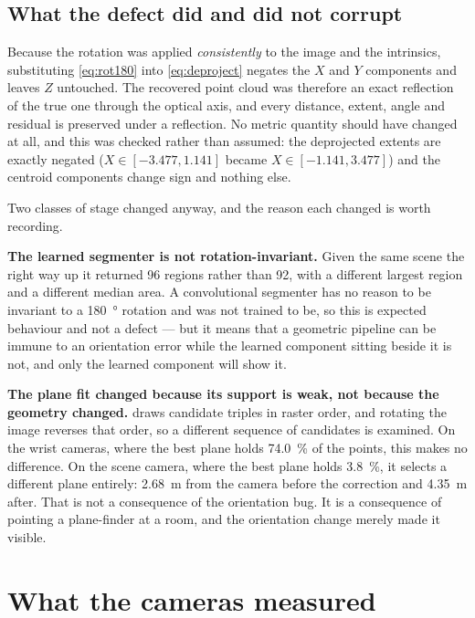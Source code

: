 \subsection{What the defect did and did not corrupt}

Because the rotation was applied \emph{consistently} to the image and the
intrinsics, substituting \cref{eq:rot180} into \cref{eq:deproject} negates the
$X$ and $Y$ components and leaves $Z$ untouched. The recovered point cloud was
therefore an exact reflection of the true one through the optical axis, and
every distance, extent, angle and residual is preserved under a reflection. No
metric quantity should have changed at all, and this was checked rather than
assumed: the deprojected extents are exactly negated
($X \in [\num{-3.477}, \num{1.141}]$ became
$X \in [\num{-1.141}, \num{3.477}]$) and the centroid components change sign
and nothing else.

Two classes of stage changed anyway, and the reason each changed is worth
recording.

\textbf{The learned segmenter is not rotation-invariant.} Given the same scene
the right way up it returned \num{96} regions rather than \num{92}, with a
different largest region and a different median area. A convolutional
segmenter has no reason to be invariant to a \SI{180}{\degree} rotation and
was not trained to be, so this is expected behaviour and not a defect --- but
it means that a geometric pipeline can be immune to an orientation error while
the learned component sitting beside it is not, and only the learned component
will show it.

\textbf{The plane fit changed because its support is weak, not because the
geometry changed.}  draws candidate triples in raster order,
and rotating the image reverses that order, so a different sequence of
candidates is examined. On the wrist cameras, where the best plane holds
\SI{74.0}{\percent} of the points, this makes no difference. On the scene
camera, where the best plane holds \SI{3.8}{\percent}, it selects a different
plane entirely: \SI{2.68}{\metre} from the camera before the correction and
\SI{4.35}{\metre} after. That is not a consequence of the orientation bug. It
is a consequence of pointing a plane-finder at a room, and the orientation
change merely made it visible.

\section{What the cameras measured}
\label{sec:vision-results}
\label{sec:vision-scene}

